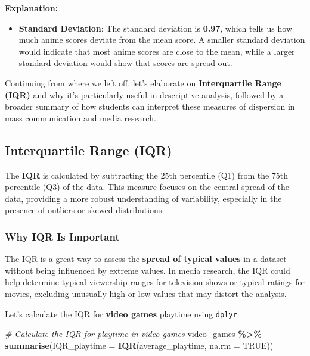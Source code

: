\documentclass[
]{book}
\newenvironment{Shaded}{\begin{snugshade}}{\end{snugshade}}
\newcommand{\AttributeTok}[1]{\textcolor[rgb]{0.13,0.29,0.53}{#1}}
\newcommand{\CommentTok}[1]{\textcolor[rgb]{0.56,0.35,0.01}{\textit{#1}}}
\newcommand{\ConstantTok}[1]{\textcolor[rgb]{0.56,0.35,0.01}{#1}}
\newcommand{\FunctionTok}[1]{\textcolor[rgb]{0.13,0.29,0.53}{\textbf{#1}}}
\newcommand{\NormalTok}[1]{#1}
\newcommand{\SpecialCharTok}[1]{\textcolor[rgb]{0.81,0.36,0.00}{\textbf{#1}}}
\providecommand{\tightlist}{%
  \setlength{\itemsep}{0pt}\setlength{\parskip}{0pt}}
\begin{document}
\textbf{Explanation:}

\begin{itemize}
\tightlist
\item
  \textbf{Standard Deviation}: The standard deviation is \textbf{0.97}, which tells us how much anime scores deviate from the mean score. A smaller standard deviation would indicate that most anime scores are close to the mean, while a larger standard deviation would show that scores are spread out.
\end{itemize}

Continuing from where we left off, let's elaborate on \textbf{Interquartile Range (IQR)} and why it's particularly useful in descriptive analysis, followed by a broader summary of how students can interpret these measures of dispersion in mass communication and media research.

\subsection*{Interquartile Range (IQR)}\label{interquartile-range-iqr}

The \textbf{IQR} is calculated by subtracting the 25th percentile (Q1) from the 75th percentile (Q3) of the data. This measure focuses on the central spread of the data, providing a more robust understanding of variability, especially in the presence of outliers or skewed distributions.

\subsubsection*{Why IQR Is Important}\label{why-iqr-is-important}

The IQR is a great way to assess the \textbf{spread of typical values} in a dataset without being influenced by extreme values. In media research, the IQR could help determine typical viewership ranges for television shows or typical ratings for movies, excluding unusually high or low values that may distort the analysis.

Let's calculate the IQR for \textbf{video games} playtime using \texttt{dplyr}:

\begin{Shaded}
\begin{Highlighting}[]
\CommentTok{\# Calculate the IQR for playtime in video games}
\NormalTok{video\_games }\SpecialCharTok{\%\textgreater{}\%}
  \FunctionTok{summarise}\NormalTok{(}\AttributeTok{IQR\_playtime =} \FunctionTok{IQR}\NormalTok{(average\_playtime, }\AttributeTok{na.rm =} \ConstantTok{TRUE}\NormalTok{))}
\end{Highlighting}
\end{Shaded}
\end{document}
